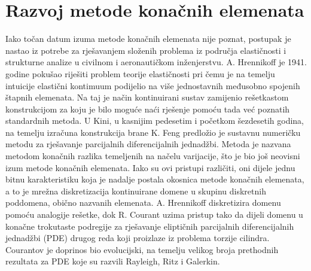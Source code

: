 \documentclass[a4paper,twoside,12pt]{memoir} %
\begin{document}
\section{Razvoj metode konačnih elemenata}
Iako točan datum izuma metode konačnih elemenata nije poznat, postupak je nastao iz potrebe za rješavanjem složenih problema iz područja elastičnosti i strukturne analize u civilnom i aeronautičkom inženjerstvu. A. Hrennikoff je 1941. godine pokušao riješiti problem teorije elastičnosti pri čemu je na temelju intuicije elastični kontimuum podijelio na više jednostavnih međusobno spojenih štapnih elemenata. Na taj je način kontinuirani sustav zamijenio rešetkastom konstrukcijom za koju je bilo moguće naći rješenje pomoću tada već poznatih standardnih metoda. U Kini, u kasnijim pedesetim i početkom šezdesetih godina, na temelju izračuna konstrukcija brane K. Feng predložio je sustavnu numeričku metodu za rješavanje parcijalnih diferencijalnih jednadžbi. Metoda je nazvana metodom konačnih razlika temeljenih na načelu varijacije, što je bio još neovisni izum metode konačnih elemenata. Iako su ovi pristupi različiti, oni dijele jednu bitnu karakteristiku koja je nadalje postala okosnica metode konačnih elemenata, a to je mrežna diskretizacija kontinuirane domene u skupinu diskretnih poddomena, obično nazvanih elemenata. A. Hrennikoff diskretizira domenu pomoću analogije rešetke, dok R. Courant uzima pristup tako da dijeli domenu u konačne trokutaste podregije za rješavanje eliptičnih parcijalnih diferencijalnih jednadžbi (PDE) drugog reda koji proizlaze iz problema torzije cilindra. Courantov je doprinos bio evolucijski, na temelju velikog broja prethodnih rezultata za PDE koje su razvili Rayleigh, Ritz i Galerkin. \cite{wiki_fem_4} \cite{wiki_fem_5} \par
\end{document}
